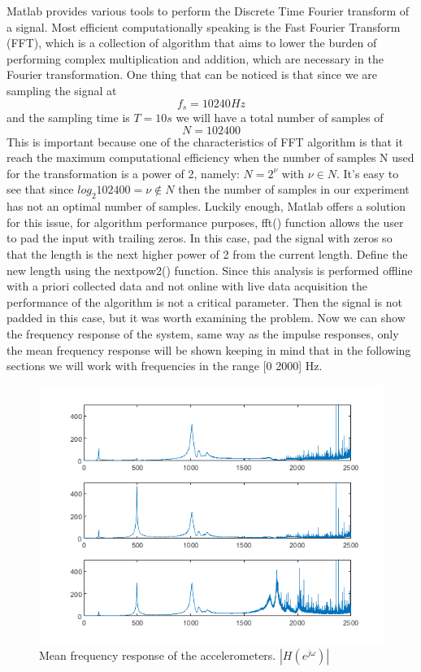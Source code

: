 \documentclass[12pt,a4paper,twoside]{article}
\begin{document}
Matlab provides various tools to perform the Discrete Time Fourier transform of a signal. Most efficient computationally speaking is the Fast Fourier Transform (FFT), which is a collection of algorithm that aims to lower the burden of performing complex multiplication and addition, which are necessary in the Fourier transformation. One thing that can be noticed is that since we are sampling the signal at $$f_s = 10240 Hz$$ and the sampling time is $T = 10 s$ we will have a total number of samples of $$ N = 102400 $$ This is important because one of the characteristics of FFT algorithm is that it reach the maximum computational efficiency when the number of samples N used for the transformation is a power of 2, namely:
$N = 2^{\nu}$ with $ \nu \in N$. It's easy to see that since $log_2 102400 = \nu \not\in N $ then the number of samples in our experiment has not an optimal number of samples. Luckily enough, Matlab offers a solution for this issue, for algorithm performance purposes, fft() function allows the user to pad the input with trailing zeros. In this case, pad the signal with zeros so that the length is the next higher power of 2 from the current length. Define the new length using the nextpow2() function. Since this analysis is performed offline with a priori collected data and not online with live data acquisition the performance of the algorithm is not a critical parameter. Then the signal is not padded in this case, but it was worth examining the problem.
Now we can show the frequency response of the system, same way as the impulse responses, only the mean frequency response will be shown keeping in mind that in the following sections we will work with frequencies in the range [0 2000] Hz. 
\begin{figure}[h!]
	\centering
	\includegraphics[width=0.9\linewidth]{Images/meanfreq.png}
	\caption{Mean frequency response of the accelerometers. $|H(e^{j\omega})|$}
	\label{meanfreq}
\end{figure}
\noindent
\end{document}

